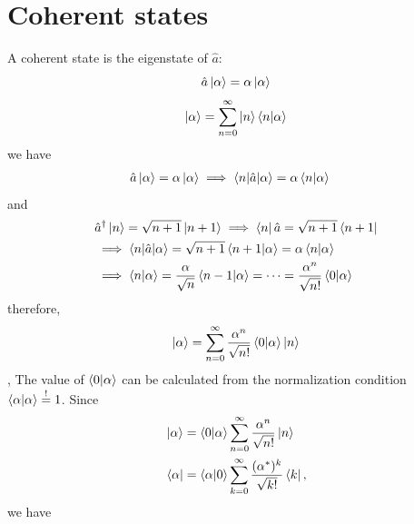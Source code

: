 \documentclass[12pt, a4paper,  nobibnotes]{article}
\begin{document}

%
%


\appendix
\section{Coherent states}
\label{appendix:coherent}
A coherent state is the eigenstate of $\hat a$:
\begin{equation*}
    \hat a \ket{\alpha} = \alpha\ket{\alpha}
\end{equation*}
\begin{align*}
    \ket\alpha = \sum\limits_{n=0}^{\infty}\ket n\braket{n|\alpha}
\end{align*}
we have
\begin{align*}
    &\hat a\ket\alpha = \alpha\ket\alpha \implies \braket{n|\hat a|\alpha}=\alpha\braket{n|\alpha}
\end{align*}
and 
\begin{align*}
    &\hat a^{\dagger}\ket n = \sqrt{n+1}\ket{n+1} \implies \bra n \hat a = \sqrt{n+1}\bra{n+1}\\
    &\implies \braket{n|\hat a|\alpha} = \sqrt{n+1}\braket{n+1|\alpha} = \alpha\braket{n|\alpha}\\
    &\implies \braket{n|\alpha} = \frac{\alpha}{\sqrt n}\braket{n-1|\alpha} = \dots = \frac{\alpha^n}{\sqrt{n!}}
    \braket{0|\alpha}
\end{align*}
therefore,
\begin{align*}
    \ket\alpha = \sum\limits_{n=0}^{\infty}\frac{\alpha^n}{\sqrt{n!}}\braket{0|\alpha}\ket n
\end{align*},
The value of $\braket{0|\alpha}$ can be calculated from the normalization condition
$\braket{\alpha|\alpha}\overset{!}{=}1$. Since
\begin{align*}
    &\ket\alpha = \braket{0|\alpha}\sum\limits_{n=0}^{\infty}\frac{\alpha^n}{\sqrt{n!}}\ket n \\ 
    &\bra\alpha = \braket{\alpha|0}\sum\limits_{k=0}^{\infty}\frac{(\alpha^*)^k}{\sqrt{k!}}\bra k,
\end{align*}
we have 
\end{document}
